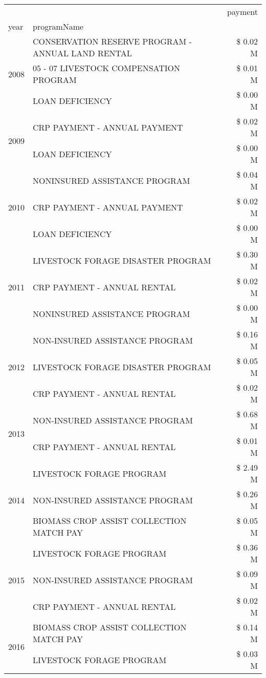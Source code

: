 \begin{tabular}{llr}
\toprule
 &  & payment \\
year & programName &  \\
\midrule
\multirow[t]{3}{*}{2008} & CONSERVATION RESERVE PROGRAM - ANNUAL LAND RENTAL & \$ 0.02 M \\
 & 05 - 07 LIVESTOCK COMPENSATION PROGRAM & \$ 0.01 M \\
 & LOAN DEFICIENCY & \$ 0.00 M \\
\cline{1-3}
\multirow[t]{2}{*}{2009} & CRP PAYMENT - ANNUAL PAYMENT & \$ 0.02 M \\
 & LOAN DEFICIENCY & \$ 0.00 M \\
\cline{1-3}
\multirow[t]{3}{*}{2010} & NONINSURED ASSISTANCE PROGRAM & \$ 0.04 M \\
 & CRP PAYMENT - ANNUAL PAYMENT & \$ 0.02 M \\
 & LOAN DEFICIENCY & \$ 0.00 M \\
\cline{1-3}
\multirow[t]{3}{*}{2011} & LIVESTOCK FORAGE DISASTER PROGRAM & \$ 0.30 M \\
 & CRP PAYMENT - ANNUAL RENTAL & \$ 0.02 M \\
 & NONINSURED ASSISTANCE PROGRAM & \$ 0.00 M \\
\cline{1-3}
\multirow[t]{3}{*}{2012} & NON-INSURED ASSISTANCE PROGRAM & \$ 0.16 M \\
 & LIVESTOCK FORAGE DISASTER PROGRAM & \$ 0.05 M \\
 & CRP PAYMENT - ANNUAL RENTAL & \$ 0.02 M \\
\cline{1-3}
\multirow[t]{2}{*}{2013} & NON-INSURED ASSISTANCE PROGRAM & \$ 0.68 M \\
 & CRP PAYMENT - ANNUAL RENTAL & \$ 0.01 M \\
\cline{1-3}
\multirow[t]{3}{*}{2014} & LIVESTOCK FORAGE PROGRAM & \$ 2.49 M \\
 & NON-INSURED ASSISTANCE PROGRAM & \$ 0.26 M \\
 & BIOMASS CROP ASSIST COLLECTION MATCH PAY & \$ 0.05 M \\
\cline{1-3}
\multirow[t]{3}{*}{2015} & LIVESTOCK FORAGE PROGRAM & \$ 0.36 M \\
 & NON-INSURED ASSISTANCE PROGRAM & \$ 0.09 M \\
 & CRP PAYMENT - ANNUAL RENTAL & \$ 0.02 M \\
\cline{1-3}
\multirow[t]{3}{*}{2016} & BIOMASS CROP ASSIST COLLECTION MATCH PAY & \$ 0.14 M \\
 & LIVESTOCK FORAGE PROGRAM & \$ 0.03 M \\

\end{tabular}
